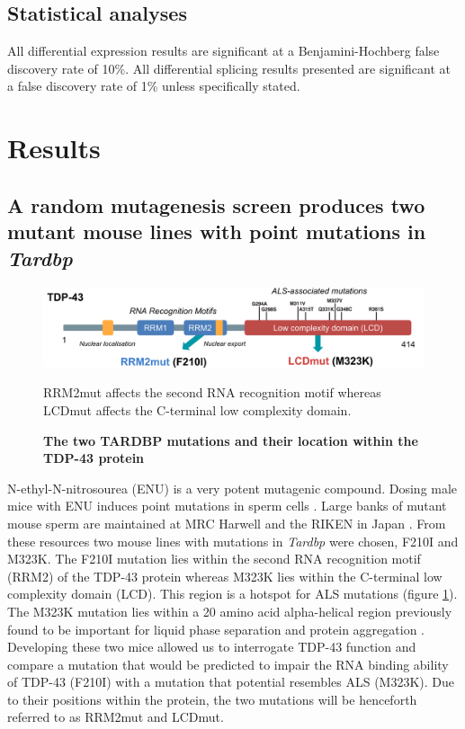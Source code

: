 \subsection{Statistical analyses}
All differential expression results are significant at a Benjamini-Hochberg false discovery rate of 10\%. 
All  differential  splicing  results  presented  are  significant  at  a  false  discovery  rate  of  1\%  unless specifically stated.

\section{Results}

\subsection{A random mutagenesis screen produces two mutant mouse lines with point mutations in \textit{Tardbp}}

\begin{figure}[h!]
	\centering
	\includegraphics[width=\textwidth]{Figures/05_tdp_mice/TDP_structure_mutations.png}
	\caption{\textbf{The two TARDBP mutations and their location within the TDP-43 protein}}
	RRM2mut affects the second RNA recognition motif whereas LCDmut affects the C-terminal low complexity domain.
	\label{fig:tdp_structure}
\end{figure}

N-ethyl-N-nitrosourea (ENU) is a very potent mutagenic compound. Dosing male mice with ENU induces point mutations in sperm cells \citep{DeAngelis2000}. 
Large banks of mutant mouse sperm are maintained at MRC Harwell \citep{Acevedo2008} and the RIKEN in Japan \citep{Gondo2010}. 
From these resources two mouse lines with mutations in \textit{Tardbp} were chosen, F210I and M323K. 
The F210I mutation lies within the second RNA recognition motif (RRM2) of the TDP-43 protein whereas M323K lies within the C-terminal low complexity domain (LCD). 
This region is a hotspot for ALS mutations (figure \ref{fig:tdp_structure}). 
The M323K mutation lies within a 20 amino acid alpha-helical region previously found to be important for liquid phase separation and protein aggregation \citep{Conicella2016}. 
Developing these two mice allowed us to interrogate TDP-43 function and compare a mutation that would be predicted to impair the RNA binding ability of TDP-43 (F210I) with a mutation that potential resembles ALS (M323K). 
Due to their positions within the protein, the two mutations will be henceforth referred to as RRM2mut and LCDmut.

